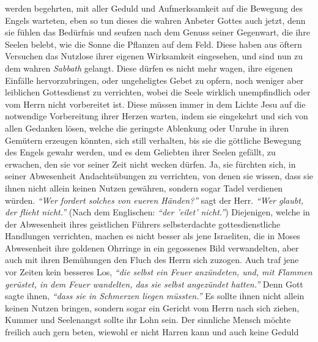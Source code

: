 werden begehrten, mit aller Geduld und Aufmerksamkeit auf
die Bewegung des
Engels warteten, eben so tun dieses die wahren Anbeter Gottes auch jetzt, denn
sie fühlen das Bedürfnis und seufzen nach dem Genuss seiner Gegenwart, die
ihre Seelen belebt, wie die Sonne die Pflanzen auf dem Feld. Diese haben aus
öftern Versuchen das Nutzlose ihrer eigenen Wirksamkeit eingesehen, und sind nun
zu dem wahren \textit{Sabbath} gelangt. Diese dürfen es nicht
mehr wagen, ihre
eigenen Einfälle hervorzubringen, oder ungeheligtes Gebet zu opfern, noch
weniger aber leiblichen Gottesdienst zu verrichten, wobei die Seele wirklich
unempfindlich oder vom Herrn nicht vorbereitet ist. Diese müssen immer in dem
Lichte Jesu auf die notwendige Vorbereitung ihrer Herzen
warten, indem sie
eingekehrt und sich von allen Gedanken lösen, welche die geringste
Ablenkung
oder Unruhe in ihren Gemütern erzeugen könnten, sich still verhalten, bis sie
die göttliche Bewegung des Engels gewahr werden, und es dem Geliebten ihrer
Seelen gefällt, zu erwachen, den sie vor seiner Zeit nicht wecken dürfen. Ja,
sie fürchten sich, in seiner Abwesenheit Andachtsübungen zu verrichten, von
denen sie wissen, dass sie ihnen nicht allein keinen Nutzen gewähren, sondern
sogar Tadel verdienen würden.
\textit{"`Wer fordert solches von eueren Händen?"'}
sagt der Herr.
\textit{"`Wer glaubt, der flieht nicht."'} (Nach dem Englischen: \textit{"`der
'eilet' nicht."'}) Diejenigen,
welche in der Abwesenheit ihres geistlichen Führers selbsterdachte
gottesdienstliche Handlungen verrichten, machen es nicht besser als jene
Israeliten, die in Moses
Abwesenheit ihre goldenen Ohrringe in ein
gegossenes Bild verwandelten, aber auch mit ihren
Bemühungen den Fluch des Herrn sich zuzogen. Auch traf jene vor
Zeiten kein besseres Los,
\textit{"`die selbst ein Feuer anzündeten, und, mit Flammen gerüstet, in dem
Feuer wandelten, das sie
selbst angezündet hatten."'} Denn Gott sagte ihnen,
\textit{"`dass sie in Schmerzen liegen müssten."'}
Es sollte ihnen nicht allein keinen
Nutzen bringen, sondern sogar ein Gericht vom Herrn nach sich ziehen, Kummer und
Seelenangst sollte ihr Lohn sein. Der sinnliche Mensch
möchte freilich auch
gern beten, wiewohl er nicht Harren kann und auch keine Geduld
